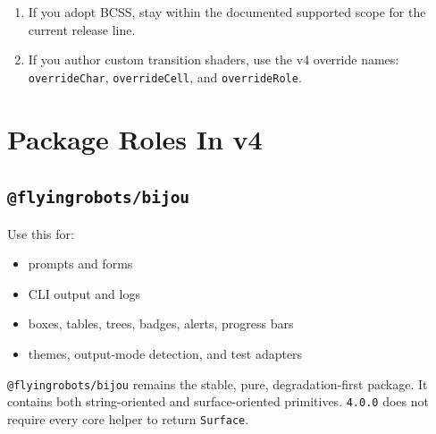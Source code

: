 \begin{enumerate}
\item
  If you adopt BCSS, stay within the documented supported scope for the current release line.
\item
  If you author custom transition shaders, use the v4 override names: \texttt{o\allowbreak{}v\allowbreak{}e\allowbreak{}r\allowbreak{}r\allowbreak{}i\allowbreak{}d\allowbreak{}e\allowbreak{}C\allowbreak{}h\allowbreak{}a\allowbreak{}r}, \texttt{o\allowbreak{}v\allowbreak{}e\allowbreak{}r\allowbreak{}r\allowbreak{}i\allowbreak{}d\allowbreak{}e\allowbreak{}C\allowbreak{}e\allowbreak{}l\allowbreak{}l}, and \texttt{o\allowbreak{}v\allowbreak{}e\allowbreak{}r\allowbreak{}r\allowbreak{}i\allowbreak{}d\allowbreak{}e\allowbreak{}R\allowbreak{}o\allowbreak{}l\allowbreak{}e}.
\end{enumerate}

\section{Package Roles In v4}\label{record-010-package-roles-in-v4}

\subsection{\texorpdfstring{\texttt{@\allowbreak{}f\allowbreak{}l\allowbreak{}y\allowbreak{}i\allowbreak{}n\allowbreak{}g\allowbreak{}r\allowbreak{}o\allowbreak{}b\allowbreak{}o\allowbreak{}t\allowbreak{}s\allowbreak{}/\allowbreak{}b\allowbreak{}i\allowbreak{}j\allowbreak{}o\allowbreak{}u}}{}}\label{record-010-flyingrobotsbijou}

Use this for:

\begin{itemize}
\tightlist
\item
  prompts and forms
\item
  CLI output and logs
\item
  boxes, tables, trees, badges, alerts, progress bars
\item
  themes, output-mode detection, and test adapters
\end{itemize}

\texttt{@\allowbreak{}f\allowbreak{}l\allowbreak{}y\allowbreak{}i\allowbreak{}n\allowbreak{}g\allowbreak{}r\allowbreak{}o\allowbreak{}b\allowbreak{}o\allowbreak{}t\allowbreak{}s\allowbreak{}/\allowbreak{}b\allowbreak{}i\allowbreak{}j\allowbreak{}o\allowbreak{}u} remains the stable, pure, degradation-first package. It contains both string-oriented and surface-oriented primitives. \texttt{4\allowbreak{}.\allowbreak{}0\allowbreak{}.\allowbreak{}0} does not require every core helper to return \texttt{S\allowbreak{}u\allowbreak{}r\allowbreak{}f\allowbreak{}a\allowbreak{}c\allowbreak{}e}.

